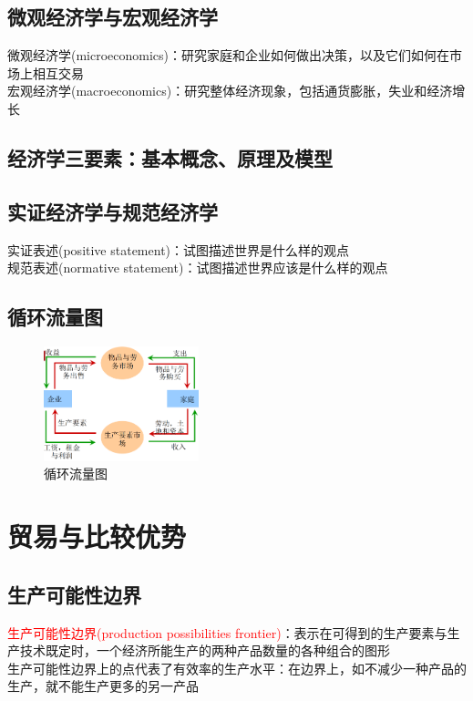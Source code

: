 \documentclass[12pt,a4paper]{article}
\begin{document}
\subsection{微观经济学与宏观经济学}
\noindent 微观经济学(microeconomics)：研究家庭和企业如何做出决策，以及它们如何在市场上相互交易\\
宏观经济学(macroeconomics)：研究整体经济现象，包括通货膨胀，失业和经济增长
\subsection{经济学三要素：基本概念、原理及模型}
\subsection{实证经济学与规范经济学}
\noindent 实证表述(positive statement)：试图描述世界是什么样的观点\\
规范表述(normative statement)：试图描述世界应该是什么样的观点
\subsection{循环流量图}
\begin{figure}[H] 
  \centering %
  \includegraphics[width=0.4\textwidth]{循环流量图.png} 
  \caption{循环流量图} %
\end{figure}


\section{贸易与比较优势}


\subsection{生产可能性边界}

\indent\textcolor{red}{生产可能性边界(production possibilities frontier)}：表示在可得到的生产要素与生产技术既定时，一个经济所能生产的两种产品数量的各种组合的图形\\

生产可能性边界上的点代表了有效率的生产水平：在边界上，如不减少一种产品的生产，就不能生产更多的另一产品
\end{document}
